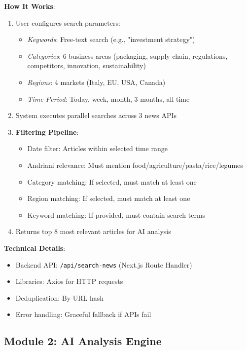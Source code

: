 \documentclass[11pt,a4paper]{article}
\begin{document}
\textbf{How It Works}:
\begin{enumerate}[leftmargin=*]
    \item User configures search parameters:
    \begin{itemize}
        \item \textit{Keywords}: Free-text search (e.g., "investment strategy")
        \item \textit{Categories}: 6 business areas (packaging, supply-chain, regulations, competitors, innovation, sustainability)
        \item \textit{Regions}: 4 markets (Italy, EU, USA, Canada)
        \item \textit{Time Period}: Today, week, month, 3 months, all time
    \end{itemize}
    
    \item System executes parallel searches across 3 news APIs
    
    \item \textbf{Filtering Pipeline}:
    \begin{itemize}
        \item Date filter: Articles within selected time range
        \item Andriani relevance: Must mention food/agriculture/pasta/rice/legumes
        \item Category matching: If selected, must match at least one
        \item Region matching: If selected, must match at least one
        \item Keyword matching: If provided, must contain search terms
    \end{itemize}
    
    \item Returns top 8 most relevant articles for AI analysis
\end{enumerate}

\textbf{Technical Details}:
\begin{itemize}[leftmargin=*]
    \item Backend API: \texttt{/api/search-news} (Next.js Route Handler)
    \item Libraries: Axios for HTTP requests
    \item Deduplication: By URL hash
    \item Error handling: Graceful fallback if APIs fail
\end{itemize}

\subsection{Module 2: AI Analysis Engine}
\end{document}
